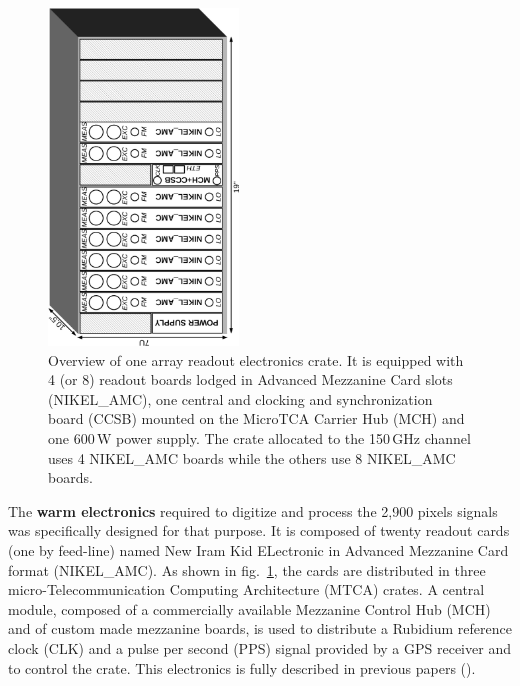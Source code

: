 \documentclass[]{aa} %
\begin{document}
\begin{figure}
\begin{center}
\includegraphics[angle=-90,width=0.45\textwidth]{NIKA_crate}
\caption{Overview of one array readout electronics crate.
It is equipped with 4 (or 8) readout boards lodged in Advanced Mezzanine Card slots (NIKEL\_AMC), one central and clocking and synchronization board (CCSB) mounted on the MicroTCA Carrier Hub (MCH) and one 600\,W power supply.
The crate allocated to the 150\,GHz channel uses 4 NIKEL\_AMC boards while the others use 8 NIKEL\_AMC boards.
\label{crateFig}}
\end{center}
\end{figure}

The \textbf{warm electronics} required to digitize and process the 2,900 pixels signals was specifically designed for that purpose.
It is composed of twenty readout cards (one by feed-line) named New Iram Kid ELectronic in Advanced Mezzanine Card format (NIKEL\_AMC).
As shown in fig.~\ref{crateFig}, the cards are distributed in three micro-Telecommunication Computing Architecture (MTCA) crates.
A central module, composed of a commercially available Mezzanine Control Hub (MCH) and of custom made mezzanine boards, is used to distribute a Rubidium reference clock (CLK) and a pulse per second (PPS) signal provided by a GPS receiver and to control the crate.
This electronics is fully described in previous papers (\cite{Bourrion2012,Bourrion2016}).
\end{document}

